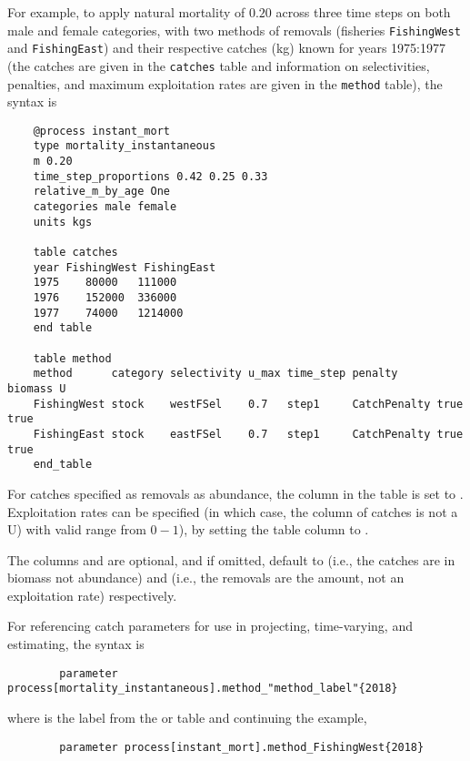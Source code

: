 For example, to apply natural mortality of $0.20$ across three time steps on both male and female categories, with two methods of removals (fisheries \texttt{FishingWest} and \texttt{FishingEast}) and their respective catches (kg) known for years 1975:1977 (the catches are given in the \texttt{catches} table and information on selectivities, penalties, and maximum exploitation rates are given in the \texttt{method} table), the syntax is

{\small{\begin{verbatim}
	@process instant_mort
	type mortality_instantaneous
	m 0.20
	time_step_proportions 0.42 0.25 0.33
	relative_m_by_age One
	categories male female
	units kgs

	table catches
	year FishingWest FishingEast
	1975	80000	111000
	1976	152000	336000
	1977	74000	1214000
	end table

	table method
	method      category selectivity u_max time_step penalty      biomass U
	FishingWest stock    westFSel    0.7   step1     CatchPenalty true    true
	FishingEast stock    eastFSel    0.7   step1     CatchPenalty true    true
	end_table
	\end{verbatim}}}

For catches specified as removals as abundance, the column  in the  table is set to . Exploitation rates can be specified (in which case, the column of catches is not a U) with valid range from $0-1$), by setting the  table column  to .

The columns  and  are optional, and if omitted, default to  (i.e., the catches are in biomass not abundance) and  (i.e., the removals are the amount, not an exploitation rate) respectively. 

For referencing catch parameters for use in projecting, time-varying, and estimating, the syntax is
{\small{\begin{verbatim}
		parameter process[mortality_instantaneous].method_"method_label"{2018}
\end{verbatim}}}

where  is the label from the  or  table and continuing the example,

{\small{\begin{verbatim}
		parameter process[instant_mort].method_FishingWest{2018}
\end{verbatim}}}

